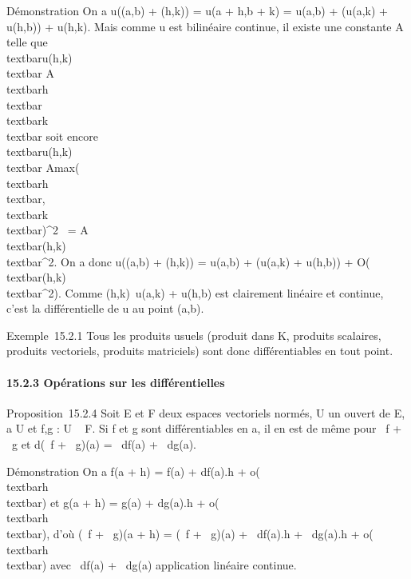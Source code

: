 \documentclass[]{article}
\begin{document}
Démonstration On a u((a,b) + (h,k)) = u(a + h,b + k) = u(a,b) +
\left (u(a,k) + u(h,b)\right ) + u(h,k).
Mais comme u est bilinéaire continue, il existe une constante A telle
que \\textbar{}u(h,k)\\textbar{} \leq
A\\textbar{}h\\textbar{}\\textbar{}k\\textbar{}
soit encore \\textbar{}u(h,k)\\textbar{} \leq
Amax(\\textbar{}h\\textbar{},\\textbar{}k\\textbar{})^2~
=
A\\textbar{}(h,k)\\textbar{}^2.
On a donc u((a,b) + (h,k)) = u(a,b) + \left (u(a,k) +
u(h,b)\right ) +
O(\\textbar{}(h,k)\\textbar{}^2).
Comme (h,k)\mapsto~u(a,k) + u(h,b) est clairement
linéaire et continue, c'est la différentielle de u au point (a,b).

Exemple~15.2.1 Tous les produits usuels (produit dans K, produits
scalaires, produits vectoriels, produits matriciels) sont donc
différentiables en tout point.

\paragraph{15.2.3 Opérations sur les différentielles}

Proposition~15.2.4 Soit E et F deux espaces vectoriels normés, U un
ouvert de E, a \in U et f,g : U \rightarrow~ F. Si f et g sont différentiables en a,
il en est de même pour \alpha~f + \beta~g et d(\alpha~f + \beta~g)(a) = \alpha~df(a) + \beta~dg(a).

Démonstration On a f(a + h) = f(a) + df(a).h +
o(\\textbar{}h\\textbar{}) et g(a + h) =
g(a) + dg(a).h +
o(\\textbar{}h\\textbar{}), d'où (\alpha~f +
\beta~g)(a + h) = (\alpha~f + \beta~g)(a) + \alpha~df(a).h + \beta~dg(a).h +
o(\\textbar{}h\\textbar{}) avec \alpha~df(a) +
\beta~dg(a) application linéaire continue.
\end{document}
